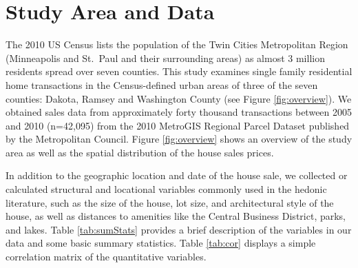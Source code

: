 \documentclass{article}\usepackage{graphicx, color}
\begin{document}
\section{Study Area and Data}
The 2010 US Census lists the population of the Twin Cities Metropolitan Region (Minneapolis and St.\ Paul and their surrounding areas) as almost 3 million residents spread over seven counties. This study examines single family residential home transactions in the Census-defined urban areas of three of the seven counties: Dakota, Ramsey and Washington County (see Figure \ref{fig:overview}). We obtained sales data from approximately forty thousand transactions between 2005 and 2010 (n=42,095) from the 2010 MetroGIS Regional Parcel Dataset published by the Metropolitan Council. Figure \ref{fig:overview} shows an overview of the study area as well as the spatial distribution of the house sales prices. 

In addition to the geographic location and date of the house sale, we collected or calculated structural and locational variables commonly used in the hedonic literature, such as the size of the house, lot size, and architectural style of the house, as well as distances to amenities like the Central Business District, parks, and lakes. Table \ref{tab:sumStats} provides a brief description of the variables in our data and some basic summary statistics. Table \ref{tab:cor} displays a simple correlation matrix of the quantitative variables.
\end{document}
